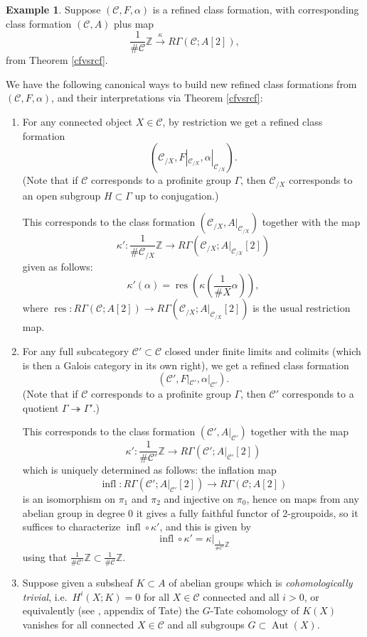 \documentclass[12pt]{article}
\theoremstyle{definition}
\newtheorem{example}[theorem]{Example}
\newcommand{\on}{\operatorname}
\newcommand{\mc}{\mathcal}
\newcommand{\mbb}{\mathbb}
\begin{document}
\begin{example}\label{newrcf}
Suppose $(\mc{C},F,\alpha)$ is a refined class formation, with corresponding class formation $(\mc{C},A)$ plus map
$$\frac{1}{\#\mc{C}}\mbb{Z} \overset{\kappa}{\rightarrow} R\Gamma(\mc{C};A[2]),$$
from Theorem \ref{cfvsrcf}.

We have the following canonical ways to build new refined class formations from $(\mc{C},F,\alpha)$, and their interpretations via Theorem \ref{cfvsrcf}:
\begin{enumerate}
\item For any connected object $X\in\mc{C}$, by restriction we get a refined class formation
$$(\mc{C}_{/X},F|_{\mc{C}_{/X}},\alpha|_{\mc{C}_{/X}}).$$
(Note that if $\mc{C}$ corresponds to a profinite group $\Gamma$, then $\mc{C}_{/X}$ corresponds to an open subgroup $H\subset\Gamma$ up to conjugation.)

This corresponds to the class formation $(\mc{C}_{/X},A|_{\mc{C}_{/X}})$ together with the map
$$\kappa':\frac{1}{\#\mc{C}_{/X}}\mbb{Z}\to R\Gamma(\mc{C}_{/X};A|_{\mc{C}_{/X}}[2])$$
given as follows:
$$\kappa'(\alpha) = \on{res}(\kappa\left(\frac{1}{\#X}\alpha\right)),$$
where $\on{res}:R\Gamma(\mc{C};A[2])\rightarrow R\Gamma(\mc{C}_{/X};A|_{\mc{C}_{/X}}[2])$ is the usual restriction map. 

\item For any full subcategory $\mc{C}'\subset\mc{C}$ closed under finite limits and colimits (which is then a Galois category in its own right), we get a refined class formation
$$(\mc{C}',F|_{\mc{C}'},\alpha|_{\mc{C}'}).$$
(Note that if $\mc{C}$ corresponds to a profinite group $\Gamma$, then $\mc{C}'$ corresponds to a quotient $\Gamma\twoheadrightarrow\Gamma'$.)

This corresponds to the class formation $(\mc{C}',A|_{\mc{C}'})$ together with the map
$$\kappa': \frac{1}{\#\mc{C}'}\mbb{Z} \to R\Gamma(\mc{C}';A|_{\mc{C}'}[2])$$
which is uniquely determined as follows: the inflation map
$$\on{infl}: R\Gamma(\mc{C}';A|_{\mc{C}'}[2])\to R\Gamma(\mc{C};A[2])$$
is an isomorphism on $\pi_1$ and $\pi_2$ and injective on $\pi_0$, hence on maps from any abelian group in degree $0$ it gives a fully faithful functor of 2-groupoids, so it suffices to characterize $\on{infl}\circ \kappa'$, and this is given by
$$\on{infl}\circ\kappa' = \kappa|_{\frac{1}{\#\mc{C}'}\mbb{Z}}$$
using that $\frac{1}{\#\mc{C}'}\mbb{Z}\subset\frac{1}{\#\mc{C}}\mbb{Z}$.

\item Suppose given a subsheaf $K\subset A$ of abelian groups which is \emph{cohomologically trivial}, i.e.\ $H^i(X;K)=0$ for all $X\in\mc{C}$ connected and all $i>0$, or equivalently (see \cite{galcoh}, appendix of Tate) the $G$-Tate cohomology of $K(X)$ vanishes for all connected $X\in\mc{C}$ and all subgroups $G\subset\on{Aut}(X)$.


\end{enumerate}
\end{example}
\end{document}
